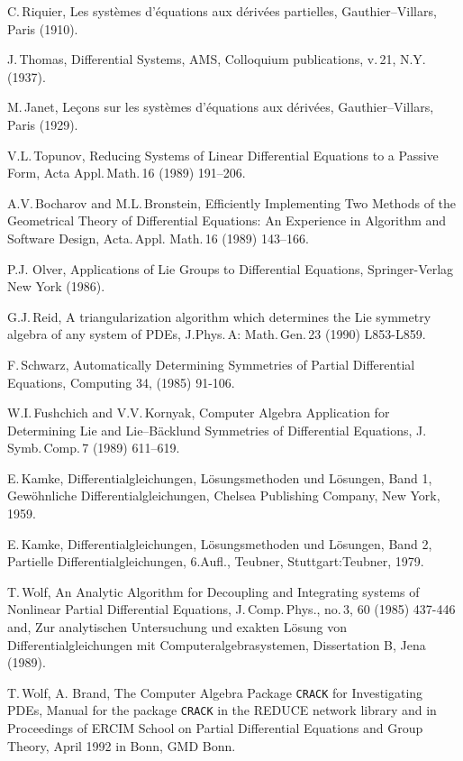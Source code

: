 \begin{thebibliography}{99}
 C.\,Riquier, Les syst\`{e}mes d'\'{e}quations
aux d\'{e}riv\'{e}es partielles, Gauthier--Villars, Paris (1910).

 J.\,Thomas, Differential Systems, AMS, Colloquium
publications, v.\,21, N.Y.\,(1937).

 M.\,Janet, Le\c{c}ons sur les syst\`{e}mes d'\'{e}quations aux
d\'{e}riv\'{e}es, Gauthier--Villars, Paris (1929).

 V.L.\,Topunov, Reducing Systems of Linear Differential
Equations to a Passive Form, Acta Appl.\,Math.\,16 (1989) 191--206.

 A.V.\,Bocharov and M.L.\,Bronstein, Efficiently
Implementing Two Methods of the Geometrical Theory of Differential
Equations: An Experience in Algorithm and Software Design, Acta.\,Appl.
Math.\,16 (1989) 143--166.

 P.J. Olver, Applications of Lie Groups to Differential
Equations, Springer-Verlag New York (1986).

 G.J.\,Reid, A triangularization algorithm which
determines the Lie symmetry algebra of any system of PDEs, J.Phys.\,A:
Math.\,Gen.\,23 (1990) L853-L859.

 F.\,Schwarz, Automatically Determining Symmetries of Partial
Differential Equations, Computing 34, (1985) 91-106.

 W.I.\,Fushchich and V.V.\,Kornyak, Computer Algebra
Application for Determining Lie and Lie--B\"{a}cklund Symmetries of
Differential Equations, J.\,Symb.\,Comp.\,7 (1989) 611--619.

 E.\,Kamke, Differentialgleichungen, L\"{o}sungsmethoden
und L\"{o}sungen, Band 1, Gew\"{o}hnliche Differentialgleichungen,
Chelsea Publishing Company, New York, 1959.

 E.\,Kamke, Differentialgleichungen, L\"{o}sungsmethoden
und L\"{o}sungen, Band 2, Partielle Differentialgleichungen, 6.Aufl.,
Teubner, Stuttgart:Teubner, 1979.

 T.\,Wolf, An Analytic Algorithm for Decoupling and Integrating
systems of Nonlinear Partial Differential Equations, J.\,Comp.\,Phys.,
no.\,3, 60 (1985) 437-446 and, Zur analytischen Untersuchung und exakten
L\"{o}sung von Differentialgleichungen mit Computeralgebrasystemen,
Dissertation B, Jena (1989).

 T.\,Wolf, A. Brand, The Computer Algebra Package {\tt CRACK}
      for Investigating PDEs, Manual for the package {\tt CRACK} in the REDUCE
      network library and in Proceedings of ERCIM School on Partial
      Differential Equations and Group Theory, April 1992 in Bonn, GMD Bonn.


\end{thebibliography}
